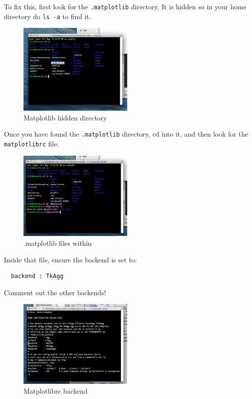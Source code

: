 \documentclass[letterpaper,10pt]{article}
\begin{document}
To fix this, first look for the \verb".matplotlib" directory. It is hidden so in your home directory do \verb"ls -a" to find it.

\begin{figure}[h!]
  \centering
  \includegraphics[width=0.5\textwidth]{images/matplotlib_hidden_directory}
  \caption{Matplotlib hidden directory}
  \label{fig:matplotlib_hidden_directory}
\end{figure}

Once you have found the \verb".matplotlib" directory, cd into it, and then look for the \verb"matplotlibrc" file. 

\begin{figure}[h!]
  \centering
  \includegraphics[width=0.5\textwidth]{images/files_in_matplotlib}
  \caption{.matplotlib files within}
  \label{fig:files_in_matplotlib}
\end{figure}

Inside that file, ensure the backend is set to:

\begin{verbatim}
  backend : TkAgg
\end{verbatim}

Comment out the other backends! 

\begin{figure}[h!]
  \centering
  \includegraphics[width=0.5\textwidth]{images/matplotlibrc_file}
  \caption{Matplotlibrc backend}
  \label{fig:matplotlibrc_file}
\end{figure}
\end{document}
